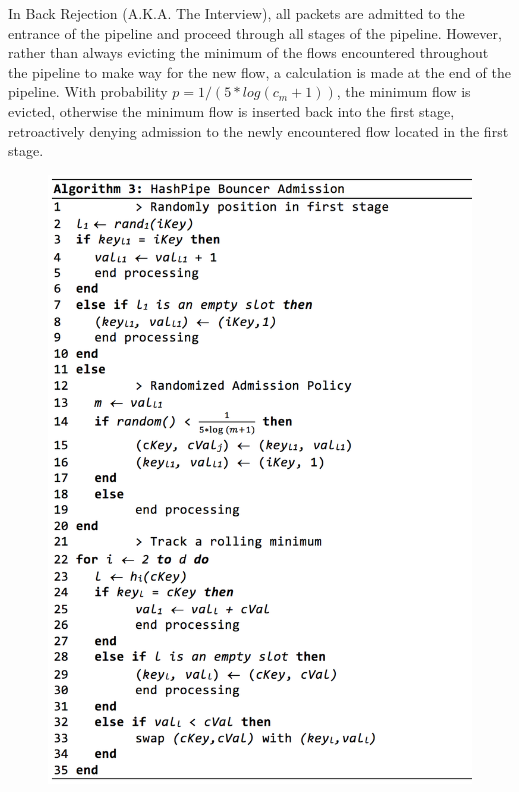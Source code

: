 In Back Rejection (A.K.A. The Interview), all packets are admitted to the entrance of the pipeline and proceed through all stages of the pipeline. However, rather than always evicting the minimum of the flows encountered throughout the pipeline to make way for the new flow, a calculation is made at the end of the pipeline. With probability $p = 1 / (5*log(c_m + 1))$, the minimum flow is evicted, otherwise the minimum flow is inserted back into the first stage, retroactively denying admission to the newly encountered flow located in the first stage. 
\begin{figure}[t]
  \centering
    \includegraphics[scale=0.42]{alg3}
     \label{fig:bp-image}
\end{figure}